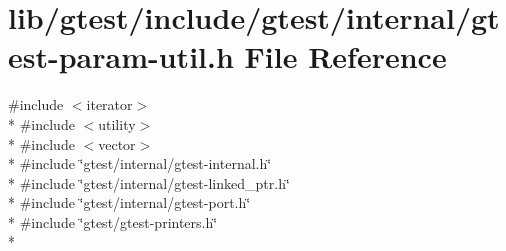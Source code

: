 \hypertarget{gtest-param-util_8h}{\section{lib/gtest/include/gtest/internal/gtest-\/param-\/util.h File Reference}
\label{gtest-param-util_8h}
}
{\ttfamily \#include $<$iterator$>$}\\*
{\ttfamily \#include $<$utility$>$}\\*
{\ttfamily \#include $<$vector$>$}\\*
{\ttfamily \#include \char`\"{}gtest/internal/gtest-\/internal.\-h\char`\"{}}\\*
{\ttfamily \#include \char`\"{}gtest/internal/gtest-\/linked\-\_\-ptr.\-h\char`\"{}}\\*
{\ttfamily \#include \char`\"{}gtest/internal/gtest-\/port.\-h\char`\"{}}\\*
{\ttfamily \#include \char`\"{}gtest/gtest-\/printers.\-h\char`\"{}}\\*
